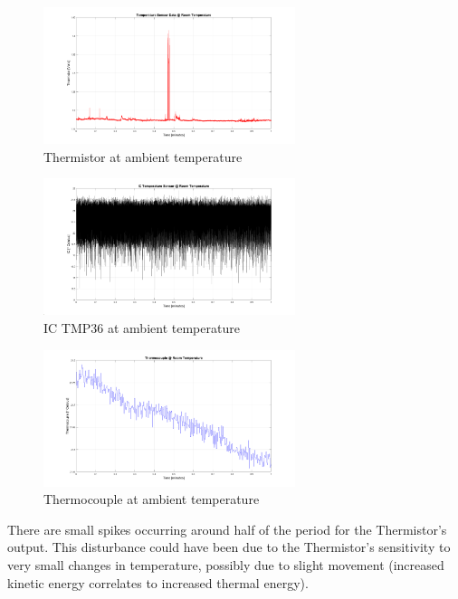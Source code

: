 \documentclass{article}
\begin{document}
\begin{figure}[H]
    \centering
    \includegraphics[width=0.655\textwidth]{lab2images/thermistor_volt_roomtemp_1min_plot.png}
    \caption{Thermistor at ambient temperature}
\end{figure}

\begin{figure}[H]
    \centering
    \includegraphics[width=0.655\textwidth]{lab2images/ICTMP36_roomtemp_1min_plot.png}
    \caption{IC TMP36 at ambient temperature}
\end{figure}

\begin{figure}[H]
    \centering
    \includegraphics[width=0.655\textwidth]{lab2images/thermocouple_roomtemp_1min_plot.png}
    \caption{Thermocouple at ambient temperature}
\end{figure}

There are small spikes occurring around half of the period for the Thermistor's output. This disturbance could have been due to the Thermistor's sensitivity to very small changes in temperature, possibly due to slight movement (increased kinetic energy correlates to increased thermal energy).
\end{document}
